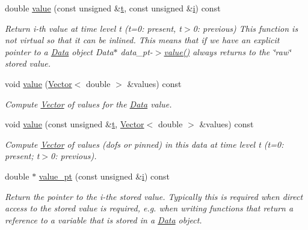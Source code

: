 \begin{DoxyCompactItemize}
double \hyperlink{classoomph_1_1Data_a3fad35eda2f9e1c69f163f1cd4d104ea}{value} (const unsigned \&\hyperlink{cfortran_8h_af6f0bd3dc13317f895c91323c25c2b8f}{t}, const unsigned \&\hyperlink{cfortran_8h_adb50e893b86b3e55e751a42eab3cba82}{i}) const
\begin{DoxyCompactList}\small\item\em Return i-\/th value at time level t (t=0\+: present, t$>$0\+: previous) This function is not virtual so that it can be inlined. This means that if we have an explicit pointer to a \hyperlink{classoomph_1_1Data}{Data} object Data$\ast$ data\+\_\+pt-\/$>$\hyperlink{classoomph_1_1Data_a9383101536882db34e618cbe30dba2da}{value()} always returns to the \char`\"{}raw\char`\"{} stored value. \end{DoxyCompactList}\item 
void \hyperlink{classoomph_1_1Data_a0a28f485ac3508c1cc37d3e0b7e86efe}{value} (\hyperlink{classoomph_1_1Vector}{Vector}$<$ double $>$ \&values) const
\begin{DoxyCompactList}\small\item\em Compute \hyperlink{classoomph_1_1Vector}{Vector} of values for the \hyperlink{classoomph_1_1Data}{Data} value. \end{DoxyCompactList}\item 
void \hyperlink{classoomph_1_1Data_a15ab0a61bc348ba1b8b73d096a1bc70f}{value} (const unsigned \&\hyperlink{cfortran_8h_af6f0bd3dc13317f895c91323c25c2b8f}{t}, \hyperlink{classoomph_1_1Vector}{Vector}$<$ double $>$ \&values) const
\begin{DoxyCompactList}\small\item\em Compute \hyperlink{classoomph_1_1Vector}{Vector} of values (dofs or pinned) in this data at time level t (t=0\+: present; t$>$0\+: previous). \end{DoxyCompactList}\item 
double $\ast$ \hyperlink{classoomph_1_1Data_a559dc196abee87cad34d655c8d6dac1e}{value\+\_\+pt} (const unsigned \&\hyperlink{cfortran_8h_adb50e893b86b3e55e751a42eab3cba82}{i}) const
\begin{DoxyCompactList}\small\item\em Return the pointer to the i-\/the stored value. Typically this is required when direct access to the stored value is required, e.\+g. when writing functions that return a reference to a variable that is stored in a \hyperlink{classoomph_1_1Data}{Data} object. \end{DoxyCompactList}\item 

\end{DoxyCompactItemize}
